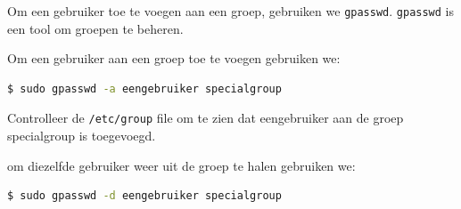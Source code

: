 Om een gebruiker toe te voegen aan een groep, gebruiken we \texttt{gpasswd}.  \texttt{gpasswd} is een tool om groepen te beheren.

Om een gebruiker aan een groep toe te voegen gebruiken we:
\begin{lstlisting}[language=bash]
$ sudo gpasswd -a eengebruiker specialgroup
\end{lstlisting}
Controlleer de \texttt{/etc/group} file om te zien dat eengebruiker aan de groep specialgroup is toegevoegd.

om diezelfde gebruiker weer uit de groep te halen gebruiken we:
\begin{lstlisting}[language=bash]
$ sudo gpasswd -d eengebruiker specialgroup
\end{lstlisting}

